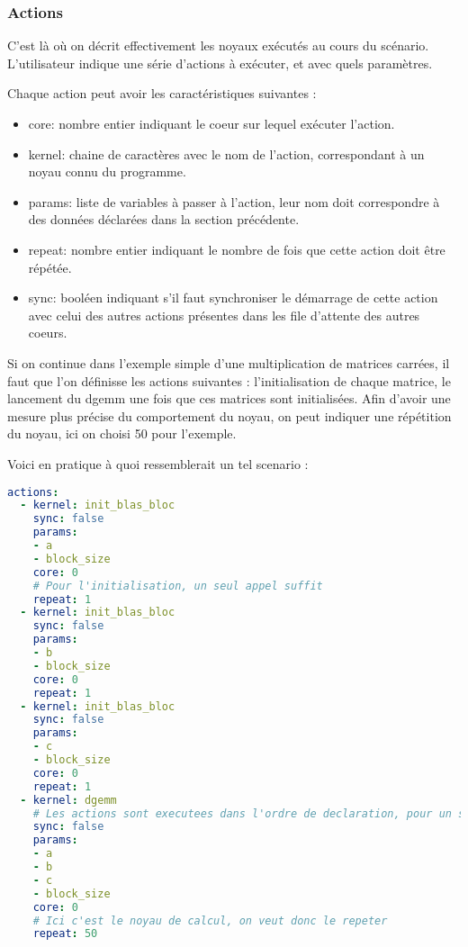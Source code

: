 \subsubsection{Actions}

C'est là où on décrit effectivement les noyaux exécutés au cours du scénario.
L'utilisateur indique une série d'actions à exécuter, et avec quels paramètres.

Chaque action peut avoir les caractéristiques suivantes :
\begin{itemize}
  \item core: nombre entier indiquant le coeur sur lequel exécuter l'action.
  \item kernel: chaine de caractères avec le nom de l'action, correspondant à un noyau connu du programme.
  \item params: liste de variables à passer à l'action, leur nom doit correspondre à des données déclarées dans la section précédente.
  \item repeat: nombre entier indiquant le nombre de fois que cette action doit être répétée.
  \item sync: booléen indiquant s'il faut synchroniser le démarrage de cette action avec celui des autres actions présentes dans les file d'attente des autres coeurs.
\end{itemize}

Si on continue dans l'exemple simple d'une multiplication de matrices carrées, il faut que l'on définisse les actions suivantes : l'initialisation de chaque matrice, le lancement du dgemm une fois que ces matrices sont initialisées.
Afin d'avoir une mesure plus précise du comportement du noyau, on peut indiquer une répétition du noyau, ici on choisi 50 pour l'exemple.

Voici en pratique à quoi ressemblerait un tel scenario :
\begin{lstlisting}[language=yaml,caption=Exemple de déclaration d'actions,label=lst:tool:actions-example]
actions:
  - kernel: init_blas_bloc
    sync: false
    params: 
    - a
    - block_size
    core: 0
    # Pour l'initialisation, un seul appel suffit
    repeat: 1
  - kernel: init_blas_bloc
    sync: false
    params: 
    - b
    - block_size
    core: 0
    repeat: 1
  - kernel: init_blas_bloc
    sync: false
    params: 
    - c
    - block_size
    core: 0
    repeat: 1
  - kernel: dgemm
    # Les actions sont executees dans l'ordre de declaration, pour un seul dgemm c'est inutile de synchroniser
    sync: false
    params: 
    - a
    - b
    - c
    - block_size
    core: 0
    # Ici c'est le noyau de calcul, on veut donc le repeter
    repeat: 50
\end{lstlisting}

